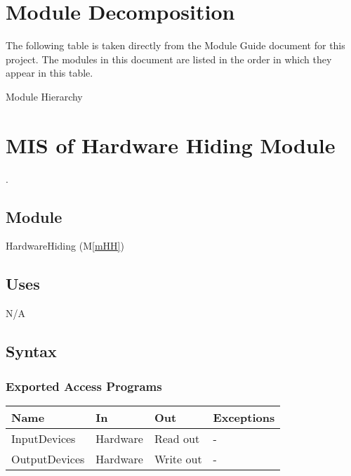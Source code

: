 \documentclass[12pt, titlepage]{article}
\newcommand{\mref}[1]{M\ref{#1}}
\begin{document}
\section{Module Decomposition}

The following table is taken directly from the Module Guide document for this
project. The modules in this document are listed in the order in which they
appear in this table.

\begin{table}[h!]
    \centering
    
    \caption{Module Hierarchy}
    \label{TblMH}
\end{table}

\newpage

\section{MIS of Hardware Hiding Module} \label{Mod:HH}

.

\subsection{Module}
HardwareHiding (\mref{mHH})

\subsection{Uses}
N/A

\subsection{Syntax}

\subsubsection{Exported Access Programs}

\begin{center}
    \begin{tabular}{p{3cm} p{4cm} p{4cm} p{2cm}}
        \hline
        \textbf{Name} & \textbf{In} & \textbf{Out} & \textbf{Exceptions} \\
        \hline
        InputDevices & Hardware & Read out & - \\
        OutputDevices & Hardware & Write out & - \\
        \hline
    \end{tabular}
\end{center}
\end{document}
